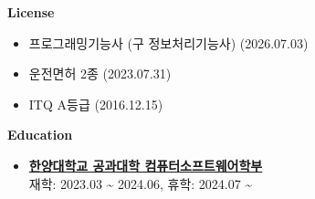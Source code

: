 \documentclass[a4paper]{article}
\newcommand{\til}{\textasciitilde{}}
\newcommand{\lnk}[2]{\href{#1}{\textcolor{ink}{\bfseries #2}}}
\newcommand{\disp}{\bfseries}
\begin{document}
\noindent
\begin{minipage}[t]{\dimexpr0.5\linewidth-3mm\relax}\vspace{0pt}\RaggedRight%
  {\color{ink}\disp\fontsize{10.2}{12.2}\selectfont License}\par
  \vspace{1.4mm}
  \begin{itemize}[itemsep=0.9mm,topsep=0pt,leftmargin=3.2mm]
    \item 프로그래밍기능사 (구 정보처리기능사) (2026.07.03)
    \item 운전면허 2종 (2023.07.31)
    \item ITQ A등급 (2016.12.15)
  \end{itemize}
\end{minipage}\hspace{6mm}%
\begin{minipage}[t]{\dimexpr0.5\linewidth-3mm\relax}\vspace{0pt}\RaggedRight%
  {\color{ink}\disp\fontsize{10.2}{12.2}\selectfont Education}\par
  \vspace{1.4mm}
  \begin{itemize}[itemsep=0.9mm,topsep=0pt,leftmargin=3.2mm]
    \item \lnk{http://cs.hanyang.ac.kr/}{한양대학교 공과대학 컴퓨터소프트웨어학부}\\
          {\color{muted}\fontsize{8.1}{10}\selectfont 재학: 2023.03 \til{} 2024.06, 휴학: 2024.07 \til{}}
  \end{itemize}
\end{minipage}
\end{document}
